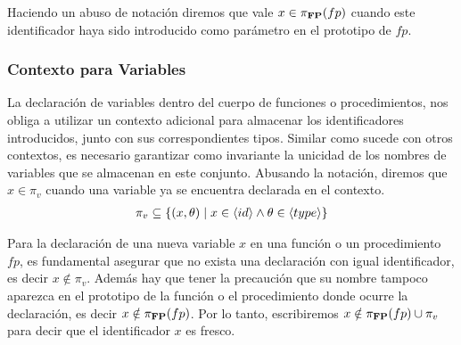 Haciendo un abuso de notación diremos que vale $x \in \pi_{\mathbf{FP}}(fp)$ cuando este identificador haya sido introducido como parámetro en el prototipo de $fp$.

\subsubsection{Contexto para Variables}

La declaración de variables dentro del cuerpo de funciones o procedimientos, nos obliga a utilizar un contexto adicional para almacenar los identificadores introducidos, junto con sus correspondientes tipos.
Similar como sucede con otros contextos, es necesario garantizar como invariante la unicidad de los nombres de variables que se almacenan en este conjunto.
Abusando la notación, diremos que $x \in \pi_{v}$ cuando una variable ya se encuentra declarada en el contexto.
\begin{gather*}
\pi_{v} \subseteq \{ (x, \theta) \mid x \in \langle id \rangle \wedge \theta \in \langle type \rangle \}
\end{gather*}

Para la declaración de una nueva variable $x$ en una función o un procedimiento $fp$, es fundamental asegurar que no exista una declaración con igual identificador, es decir  $x \notin \pi_{v}$.
Además hay que tener la precaución que su nombre tampoco aparezca en el prototipo de la función o el procedimiento donde ocurre la declaración, es decir $x \notin \pi_{\mathbf{FP}}(fp)$.
Por lo tanto, escribiremos $x \notin \pi_{\mathbf{FP}}(fp) \cup \pi_{v}$ para decir que el identificador $x$ es fresco.

